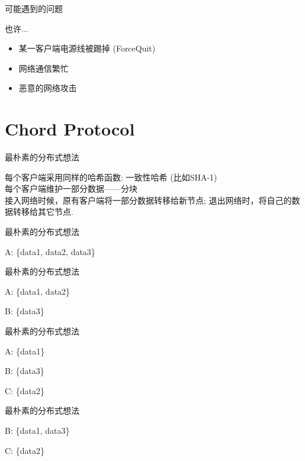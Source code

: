 \documentclass[10pt]{beamer}
\begin{document}
\begin{frame}[fragile]{可能遇到的问题}

也许...
	\begin{itemize}
		\item 某一客户端电源线被踢掉 (ForceQuit)
		\item 网络通信繁忙
		\item 恶意的网络攻击
	\end{itemize}

\end{frame}

\section{Chord Protocol}
\begin{frame}{最朴素的分布式想法}

每个客户端采用同样的哈希函数: 一致性哈希 (比如SHA-1)
\\[20pt]
每个客户端维护一部分数据——分块
\\[20pt]
接入网络时候，原有客户端将一部分数据转移给新节点;
退出网络时，将自己的数据转移给其它节点.

\end{frame}

\begin{frame}{最朴素的分布式想法}

\alert{A:} \{data1, data2, data3\}

\end{frame}

\begin{frame}{最朴素的分布式想法}

\alert{A:} \{data1, data2\}

\alert{B:} \{data3\}

\end{frame}

\begin{frame}{最朴素的分布式想法}

\alert{A:} \{data1\}

\alert{B:} \{data3\}

\alert{C:} \{data2\}

\end{frame}


\begin{frame}{最朴素的分布式想法}

\alert{B:} \{data1, data3\}

\alert{C:} \{data2\}

\end{frame}
\end{document}

